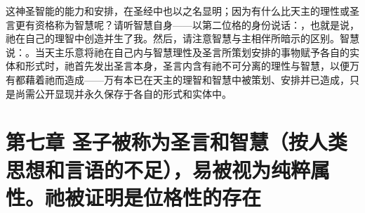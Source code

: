 这神圣智能的能力和安排，在圣经中也以之名显明；因为有什么比天主的理性或圣言更有资格称为智慧呢？请听智慧自身——以第二位格的身份说话：，也就是说，祂在自己的理智中创造并生了我。然后，请注意智慧与主相伴所暗示的区别。智慧说：。当天主乐意将祂在自己内与智慧理性及圣言所策划安排的事物赋予各自的实体和形式时，祂首先发出圣言本身，圣言内含有祂不可分离的理性与智慧，以便万有都藉着祂而造成——万有本已在天主的理智和智慧中被策划、安排并已造成，只是尚需公开显现并永久保存于各自的形式和实体中。\par


\section{第七章 圣子被称为圣言和智慧（按人类思想和言语的不足），易被视为纯粹属性。祂被证明是位格性的存在}

